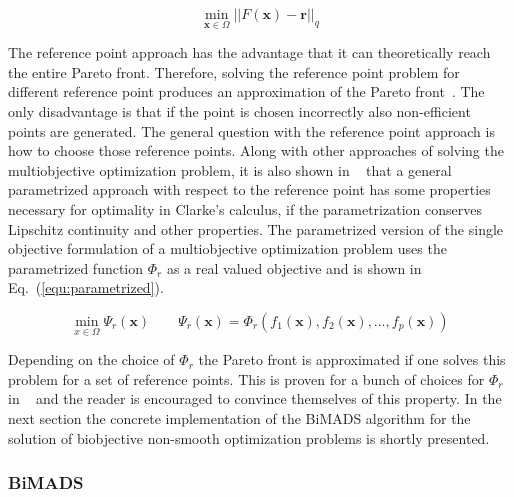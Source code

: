 \documentclass[a4paper,10pt]{article}
\renewcommand{\vec}[1]{\mathbf{#1}}
\newcommand{\equref}[1]{Eq.~(\ref{#1})}
\begin{document}
    \begin{equation}
        \label{equ:reference_point}
        \min_{\vec{x} \in \Omega} || F(\vec{x}) - \vec{r} ||_q
    \end{equation}

    The reference point approach has the advantage that it can theoretically
    reach the entire Pareto front.
    Therefore, solving the reference point problem for different reference point
    produces an approximation of the Pareto front~\cite{multiobjective}.
    The only disadvantage is that if the point is chosen incorrectly
    also non-efficient points are generated.
    The general question with the reference point approach is how to
    choose those reference points.
    Along with other approaches of solving the multiobjective optimization
    problem, it is also shown in ~\cite{multiobjective} that a general
    parametrized approach with respect to the reference point has some
    properties necessary for optimality in Clarke's calculus, if the
    parametrization conserves Lipschitz continuity and other properties.
    The parametrized version of the single objective formulation of 
    a multiobjective optimization problem uses the parametrized function
    $\Phi_r$ as a real valued objective and is shown in
    \equref{equ:parametrized}.
    
    \begin{equation}
        \label{equ:parametrized}
        \min_{x \in \Omega} \Psi_r(\vec{x}) \quad \quad \Psi_r(\vec{x}) =
         \Phi_r(f_1(\vec{x}),f_2(\vec{x}),\dots,f_p(\vec{x})) 
    \end{equation}

    Depending on the choice of $\Phi_r$ the Pareto front is approximated
    if one solves this problem for a set of reference points.
    This is proven for a bunch of choices for $\Phi_r$ in ~\cite{multiobjective}
    and the reader is encouraged to convince themselves of this property.
    In the next section the concrete implementation of the BiMADS algorithm
    for the solution of biobjective non-smooth optimization problems 
    is shortly presented.

    \subsubsection{BiMADS} \label{sec:bimads}
\end{document}
